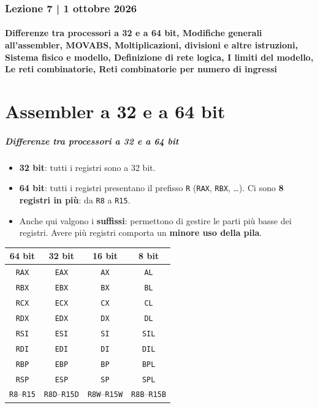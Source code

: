 \documentclass[11pt,a4paper]{article}
\begin{document}
	\section*{Lezione 7 | 1 ottobre 2026}
	\subsection*{Differenze tra processori a 32 e a 64 bit, Modifiche generali all'assembler, MOVABS, Moltiplicazioni, divisioni e altre istruzioni, Sistema fisico e modello, Definizione di rete logica, I limiti del modello, Le reti combinatorie, Reti combinatorie per numero di ingressi}

\part{Assembler a 32 e a 64 bit}

\subsubsection*{Differenze tra processori a 32 e a 64 bit}

\begin{itemize}[leftmargin=*]
  \item \textbf{32 bit}: tutti i registri sono a 32 bit.
  \item \textbf{64 bit}: tutti i registri presentano il prefisso \texttt{R} (\texttt{RAX}, \texttt{RBX}, \ldots). Ci sono \textbf{8 registri in più}: da \texttt{R8} a \texttt{R15}.
  \item Anche qui valgono i \textbf{suffissi}: permettono di gestire le parti più basse dei registri. Avere più registri comporta un \textbf{minore uso della pila}.
\end{itemize}

\begin{integrazione}
\begin{center}
\begin{tabular}{c c c c}
\textbf{64 bit} & \textbf{32 bit} & \textbf{16 bit} & \textbf{8 bit} \\ \hline
\texttt{RAX} & \texttt{EAX} & \texttt{AX} & \texttt{AL} \\
\texttt{RBX} & \texttt{EBX} & \texttt{BX} & \texttt{BL} \\
\texttt{RCX} & \texttt{ECX} & \texttt{CX} & \texttt{CL} \\
\texttt{RDX} & \texttt{EDX} & \texttt{DX} & \texttt{DL} \\
\texttt{RSI} & \texttt{ESI} & \texttt{SI} & \texttt{SIL} \\
\texttt{RDI} & \texttt{EDI} & \texttt{DI} & \texttt{DIL} \\
\texttt{RBP} & \texttt{EBP} & \texttt{BP} & \texttt{BPL} \\
\texttt{RSP} & \texttt{ESP} & \texttt{SP} & \texttt{SPL} \\
\texttt{R8}--\texttt{R15} & \texttt{R8D}--\texttt{R15D} & \texttt{R8W}--\texttt{R15W} & \texttt{R8B}--\texttt{R15B} \\
\end{tabular}
\end{center}
\end{integrazione}
\end{document}
